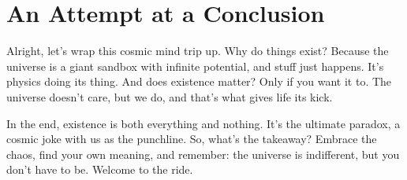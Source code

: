 \documentclass{Axon}
\begin{document}
\section{An Attempt at a Conclusion}
Alright, let's wrap this cosmic mind trip up. Why do things exist? Because the universe is a giant sandbox with infinite potential, and stuff just happens. It’s physics doing its thing. And does existence matter? Only if you want it to. The universe doesn’t care, but we do, and that’s what gives life its kick.

In the end, existence is both everything and nothing. It’s the ultimate paradox, a cosmic joke with us as the punchline. So, what’s the takeaway? Embrace the chaos, find your own meaning, and remember: the universe is indifferent, but you don't have to be. Welcome to the ride.
\end{document}
